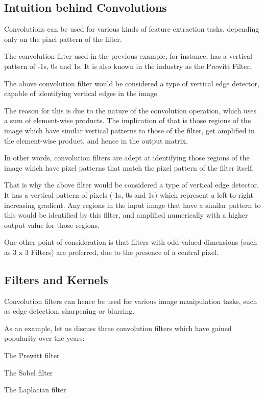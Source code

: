 	\subsection{Intuition behind Convolutions}

	\begin{bulletedlist}
		\item Convolutions can be used for various kinds of feature extraction tasks, depending only on the pixel pattern of the filter.
		\item The convolution filter used in the previous example, for instance, has a vertical pattern of -1s, 0s and 1s.  It is also known in the industry as the Prewitt Filter.
		\item The above convolution filter would be considered a type of vertical edge detector, capable of identifying vertical edges in the image.
		\item The reason for this is due to the nature of the convolution operation, which uses a sum of element-wise products. The  implication of that is those regions of the image which have similar vertical patterns to those of the filter, get amplified in
the element-wise product, and hence in the output matrix.
		\item In other words, convolution filters are adept at identifying those regions of the image which have pixel patterns that match the pixel pattern of the filter itself.
		\item That is why the above filter would be considered a type of vertical edge detector.  It has a vertical pattern of pixels (-1s, 0s and 1s) which represent a left-to-right increasing gradient.  Any regions in the input image that have a similar pattern to this would be identified by this filter, and amplified numerically with a higher output value for those regions.
		\item One other point of consideration is that filters with odd-valued dimensions (such as 3 x 3 Filters) are preferred, due to the presence of a central pixel.
		\item 
		\item 
	\end{bulletedlist}


	\subsection{Filters and Kernels}
	\begin{bulletedlist}
		\item Convolution filters can hence be used for various image manipulation tasks, such as edge detection, sharpening or blurring.
		\item As an example, let us discuss three convolution filters which have gained popularity over the years:
		\begin{bulletedlist}
			\item The Prewitt filter
			\item The Sobel filter
			\item The Laplacian filter
		\end{bulletedlist}
	\end{bulletedlist}

